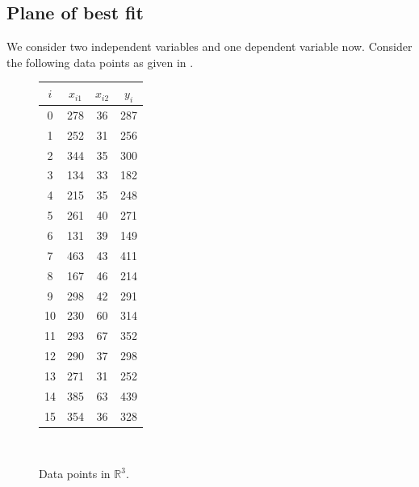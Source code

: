 \documentclass[a4paper, 12pt]{article}
\numberwithin{equation}{section}
\numberwithin{figure}{section}
\theoremstyle{definition}
\newcommand{\R}{\mathbb{R}}
\begin{document}
\subsection{Plane of best fit}

We consider two independent variables and one dependent variable now. Consider
the following data points as given in .

\begin{figure}[h]
	\centering
	\begin{minipage}{0.3\textwidth}
		\centering 
		\begin{tabular}{cccc}
			$i$ & $x_{i1}$ & $x_{i2}$ & $y_i$ \\ \hline
			0 & 278 & 36 & 287 \\
			1 & 252 & 31 & 256 \\
			2 & 344 & 35 & 300 \\
			3 & 134 & 33 & 182 \\
			4 & 215 & 35 & 248 \\
			5 & 261 & 40 & 271 \\
			6 & 131 & 39 & 149 \\
			7 & 463 & 43 & 411 \\
			8 & 167 & 46 & 214 \\
			9 & 298 & 42 & 291 \\
			10 & 230 & 60 & 314 \\
			11 & 293 & 67 & 352 \\
			12 & 290 & 37 & 298 \\
			13 & 271 & 31 & 252 \\
			14 & 385 & 63 & 439 \\
			15 & 354 & 36 & 328
		\end{tabular}
	\end{minipage}~%
	\begin{minipage}{0.6\textwidth}
	\end{minipage}	
	\caption{Data points in $\R^3$.}
	\label{fig:3d-data-points}
\end{figure}
\end{document}

